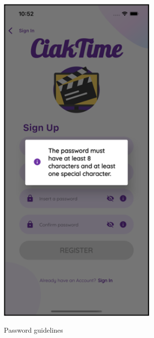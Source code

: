 \documentclass[12pt, a4paper]{article}
\numberwithin{figure}{section}
\begin{document}
\begin{center}
\begin{minipage}[t]{0.31\textwidth}
\begin{figure}[H]
			\includegraphics[width=0.71\textwidth]{images/final/infoPass.png}\\
			\caption{Password guidelines}
		\end{figure}
	\end{minipage}
	\hspace{0.015\linewidth}
	\begin{minipage}[t]{0.31\textwidth}
		\begin{figure}[H]
			\centering

\end{figure}
\end{minipage}
\end{center}
\end{document}
